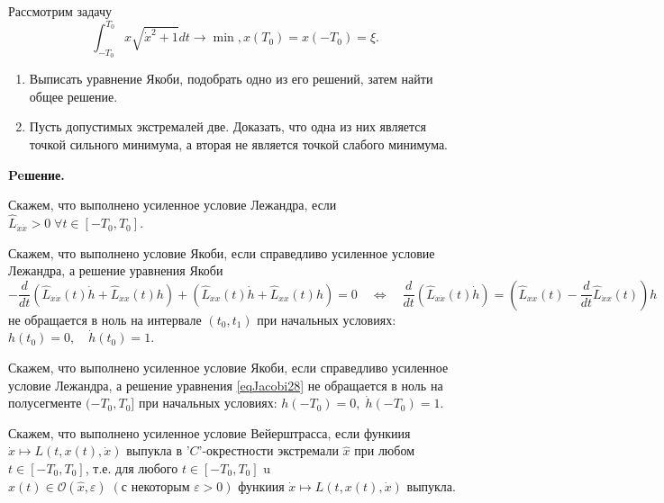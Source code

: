 \begin{task}
    Рассмотрим задачу
    \begin{equation*}
        \int_{-T_0}^{T_0} x \sqrt{\dot{x}^2+1} d t \rightarrow \min , 
        x\left(T_0\right) = x \left( -T_0 \right) = \xi.
    \end{equation*}
    \begin{enumerate}
        \item Выписать уравнение Якоби, подобрать одно из его решений, 
        затем найти общее решение. 
        \item Пусть допустимых экстремалей две. Доказать, что одна из них 
        является точкой сильного минимума, а вторая не является точкой слабого минимума.
    \end{enumerate}


    \textbf{Peшение.} 
    \begin{definition}
        Скажем, что выполнено усиленное условие Лежандра, 
        если $\widehat L_{\dot{x}\dot{x}} > 0 \; \forall t \in [-T_0, T_0]$.
    \end{definition}

    \begin{definition} Скажем, что выполнено условие Якоби, 
        если справедливо усиленное условие Лежандра, а решение уравнения Якоби
        \begin{equation} \label{eqJacobi28} 
            -\frac{d}{d t}\left(\widehat{L}_{\dot{x} \dot{x}}(t) \dot{h}
                +\widehat{L}_{\dot{x} x}(t) h\right)
                +\left(\widehat{L}_{\dot{x} x}(t) \dot{h}
                +\widehat{L}_{x x}(t) h\right)=0 \quad 
                \Leftrightarrow \quad \frac{d}{d t}\left(\widehat{L}_{\dot{x} \dot{x}}(t) \dot{h}\right)
                =\left(\widehat{L}_{x x}(t)-\frac{d}{d t} \widehat{L}_{\dot{x} x}(t)\right) h
        \end{equation}
        не обращается в ноль на интервале $\left(t_0, t_1\right)$ при начальных условиях: 
        $h\left(t_0\right)=0, \quad \dot{h}\left(t_0\right)=1$. 
    \end{definition}
    \begin{definition}
        Скажем, что выполнено усиленное условие Якоби, если справедливо усиленное условие 
        Лежандра, а решение уравнения \eqref{eqJacobi28} не обращается в ноль на полусегменте
        $(-T_0, T_0]$ при начальных условиях: ${h(-T_0)=0, \; \dot{h}(-T_0)=1}$.
    \end{definition}

    \begin{definition}
        Скажем, что выполнено усиленное условие Вейерштрасса, 
        если функиия $\dot{x} \mapsto L(t, x(t), \dot{x})$ 
        выпукла в '$C$'-окрестности экстремали $\widehat{x}$ 
        при любом $t \in\left[-T_0, T_0\right]$, т.е. для любого 
        $t \in\left[-T_0, T_0\right]$ u $x(t) \in 
        \mathcal{O}(\widehat{x}, \varepsilon) \;
        (\text {с некоторым } {\varepsilon>0})$ функиия
        $\dot{x} \mapsto L(t, x(t), \dot{x})$ выпукла.
    \end{definition}


\end{task}
